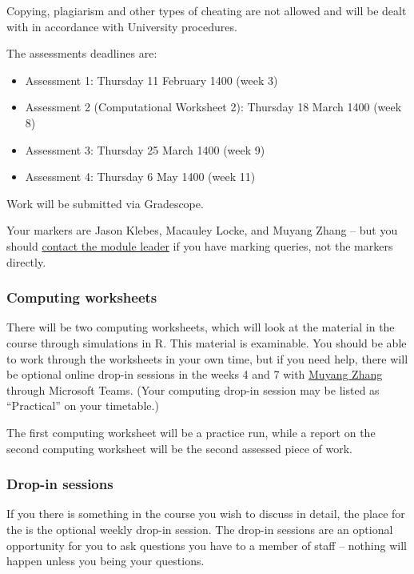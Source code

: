 \documentclass[
  a4paper,
]{article}
\providecommand{\tightlist}{%
  \setlength{\itemsep}{0pt}\setlength{\parskip}{0pt}}
\theoremstyle{definition}
\theoremstyle{definition}
\theoremstyle{definition}
\theoremstyle{remark}
\begin{document}
Copying, plagiarism and other types of cheating are not allowed and will be dealt with in accordance with University procedures.

The assessments deadlines are:

\begin{itemize}
\tightlist
\item
  Assessment 1: Thursday 11 February 1400 (week 3)
\item
  Assessment 2 (Computational Worksheet 2): Thursday 18 March 1400 (week 8)
\item
  Assessment 3: Thursday 25 March 1400 (week 9)
\item
  Assessment 4: Thursday 6 May 1400 (week 11)
\end{itemize}

Work will be submitted via Gradescope.

Your markers are Jason Klebes, Macauley Locke, and Muyang Zhang -- but you should \href{mailto:m.aldridge@leeds.ac.uk}{contact the module leader} if you have marking queries, not the markers directly.

\hypertarget{about-computing}{%
\subsubsection*{Computing worksheets}\label{about-computing}}

There will be two computing worksheets, which will look at the material in the course through simulations in R. This material is examinable. You should be able to work through the worksheets in your own time, but if you need help, there will be optional online drop-in sessions in the weeks 4 and 7 with \href{https://eps.leeds.ac.uk/maths/pgr/6422/muyang-zhang}{Muyang Zhang} through Microsoft Teams. (Your computing drop-in session may be listed as ``Practical'' on your timetable.)

The first computing worksheet will be a practice run, while a report on the second computing worksheet will be the second assessed piece of work.

\hypertarget{dropin}{%
\subsubsection*{Drop-in sessions}\label{dropin}}

If you there is something in the course you wish to discuss in detail, the place for the is the optional weekly drop-in session. The drop-in sessions are an optional opportunity for you to ask questions you have to a member of staff -- nothing will happen unless you being your questions.
\end{document}
